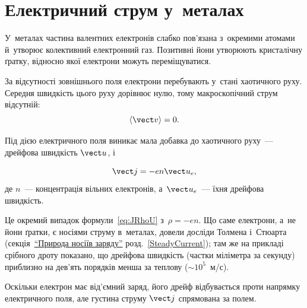 \section{Електричний струм у~металах}\label{sec:CurrentInMetals}\hypertarget{current-in-metals}{}


У~металах частина валентних електронів слабко пов'язана з~окремими атомами й~утворює
колективний електронний газ. Позитивні йони утворюють кристалічну ґратку, відносно якої
електрони можуть переміщуватися.

За відсутності зовнішнього поля електрони перебувають у~стані хаотичного руху. Середня
швидкість цього руху дорівнює нулю, тому макроскопічний струм відсутній:
\begin{equation*}
	\langle\vect v\rangle = 0.
\end{equation*}

Під дією електричного поля виникає мала добавка до хаотичного руху~--- дрейфова швидкість
$\vect u$, і

\begin{equation*}
	\vect j = -en\vect u_e,
\end{equation*}
де $n$~--- концентрація вільних електронів, а~$\vect u_e$~--- їхня дрейфова швидкість.

Це окремий випадок формули~\eqref{eq:JRhoU} з~$\rho=-en$. Що саме електрони, а~не йони
ґратки, є носіями струму в~металах, довели досліди Толмена і~Стюарта
(секція~\hyperlink{charge-carriers-nature}{\enquote{Природа носіїв заряду}}
розд.~\ref{SteadyCurrent}); там же на прикладі срібного дроту показано, що дрейфова
швидкість (частки міліметра за секунду) приблизно на дев'ять порядків менша за теплову
($\sim10^5$~м/с).

Оскільки електрон має від'ємний заряд, його дрейф відбувається проти напрямку електричного
поля, але густина струму $\vect j$ спрямована за полем.


